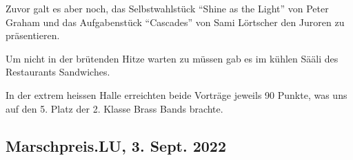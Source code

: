 \begin{history}
    Zuvor galt es aber noch, das Selbstwahlstück \enquote{Shine as the Light}
    von Peter Graham und das Aufgabenstück \enquote{Cascades} von
    Sami Lörtscher den Juroren zu präsentieren.

    Um nicht in der brütenden Hitze warten zu müssen gab es im kühlen Sääli des
    Restaurants Sandwiches.

    In der extrem heissen Halle erreichten beide Vorträge jeweils 90 Punkte, was
    uns auf den 5. Platz der 2. Klasse Brass Bands brachte.

\end{history}

\subsection*{Marschpreis.LU, 3. Sept. 2022}

